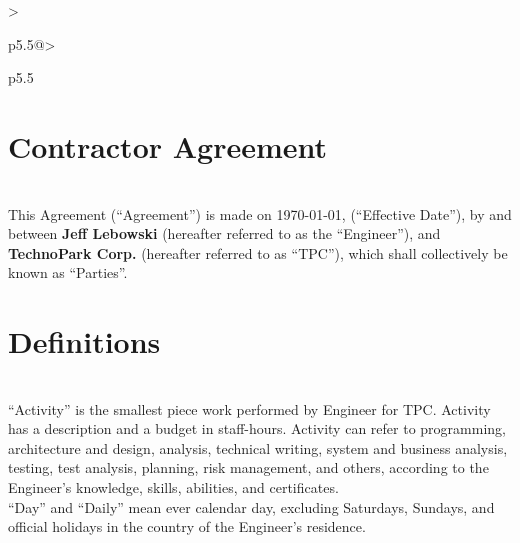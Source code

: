 \documentclass[10pt,letterpaper,oneside,twocolumn]{article}
\newcommand{\engineerName}      {Jeff Lebowski}
\begin{document}
    \fontsize{9pt}{9pt}\selectfont

    \renewcommand*\arraystretch{1.5}
    \begin{mpxtabular}{>{\raggedright\arraybackslash }p{5.5\TPHorizModule}@{\hspace{\TPHorizModule}}>{\raggedright\normalfont\selectfont\arraybackslash}p{5.5\TPHorizModule}}

    \section*{Contractor Agreement} \\

        This Agreement (``Agreement'') is made on \today, (``Effective Date''),
        by and between \textbf{\engineerName{}} (hereafter referred to as the ``Engineer''),
        and \textbf{TechnoPark Corp.} (hereafter referred to as ``TPC''), which
        shall collectively be known as ``Parties''. \\

    \section{Definitions} \\

        ``Activity'' is the smallest piece work performed by Engineer for TPC.
        Activity has a description and a budget in staff-hours.
        Activity can refer to programming, architecture and design, analysis, technical writing,
        system and business analysis, testing, test analysis, planning, risk management, and others,
        according to the Engineer's knowledge, skills, abilities, and certificates. \\

        ``Day'' and ``Daily'' mean ever calendar day, excluding Saturdays, Sundays,
        and official holidays in the country of the Engineer's residence. \\


\end{mpxtabular}
\end{document}
